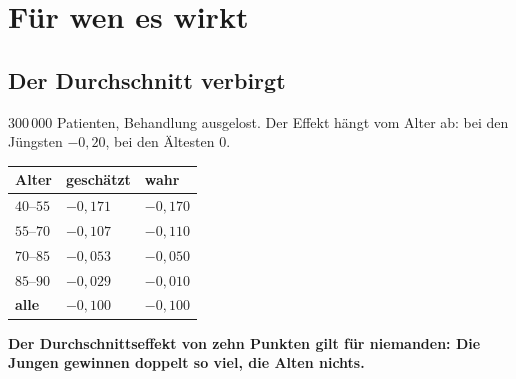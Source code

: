 \chapter{Für wen es wirkt}

\section{Der Durchschnitt verbirgt}

\begin{merksatz}
$300\,000$ Patienten, Behandlung ausgelost. Der Effekt hängt vom Alter ab: bei den Jüngsten $-0{,}20$, bei den Ältesten $0$.

\begin{center}
{\small
\renewcommand{\arraystretch}{1.48}
\begin{tabular}{@{}P{2.2cm}P{2.4cm}P{2.4cm}@{}}
\toprule
\textbf{Alter} & \textbf{geschätzt} & \textbf{wahr}\\
\midrule
$40$--$55$ & $-0{,}171$ & $-0{,}170$\\
$55$--$70$ & $-0{,}107$ & $-0{,}110$\\
$70$--$85$ & $-0{,}053$ & $-0{,}050$\\
$85$--$90$ & $-0{,}029$ & $-0{,}010$\\
\midrule
\textbf{alle} & \textbf{$-0{,}100$} & $-0{,}100$\\
\bottomrule
\end{tabular}}
\end{center}

\begin{center}
\begin{minipage}{0.9\textwidth}
\textbf{Der Durchschnittseffekt von zehn Punkten gilt für niemanden: Die Jungen gewinnen doppelt so viel, die Alten nichts.}
\end{minipage}
\end{center}

\begin{center}
\begin{minipage}{0.88\textwidth}
\end{minipage}
\end{center}
\end{merksatz}

